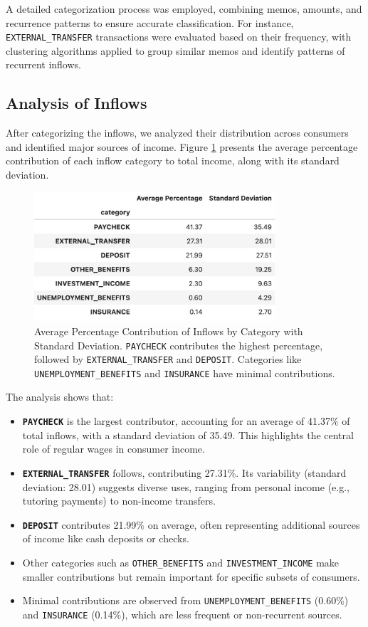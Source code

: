 \documentclass[12pt,letterpaper]{article}
\begin{document}
A detailed categorization process was employed, combining memos, amounts, and recurrence patterns to ensure accurate classification. For instance, \texttt{EXTERNAL\_TRANSFER} transactions were evaluated based on their frequency, with clustering algorithms applied to group similar memos and identify patterns of recurrent inflows.

\subsection{Analysis of Inflows}
After categorizing the inflows, we analyzed their distribution across consumers and identified major sources of income. Figure \ref{fig:inflow_contributions} presents the average percentage contribution of each inflow category to total income, along with its standard deviation.

\begin{figure}[H]
    \centering
    \includegraphics[width=0.8\textwidth]{figure/inflows.jpeg}
    \caption{Average Percentage Contribution of Inflows by Category with Standard Deviation. \texttt{PAYCHECK} contributes the highest percentage, followed by \texttt{EXTERNAL\_TRANSFER} and \texttt{DEPOSIT}. Categories like \texttt{UNEMPLOYMENT\_BENEFITS} and \texttt{INSURANCE} have minimal contributions.}
    \label{fig:inflow_contributions}
\end{figure}

The analysis shows that:
\begin{itemize}
    \item \textbf{\texttt{PAYCHECK}} is the largest contributor, accounting for an average of 41.37\% of total inflows, with a standard deviation of 35.49. This highlights the central role of regular wages in consumer income.
    \item \textbf{\texttt{EXTERNAL\_TRANSFER}} follows, contributing 27.31\%. Its variability (standard deviation: 28.01) suggests diverse uses, ranging from personal income (e.g., tutoring payments) to non-income transfers.
    \item \textbf{\texttt{DEPOSIT}} contributes 21.99\% on average, often representing additional sources of income like cash deposits or checks.
    \item Other categories such as \texttt{OTHER\_BENEFITS} and \texttt{INVESTMENT\_INCOME} make smaller contributions but remain important for specific subsets of consumers.
    \item Minimal contributions are observed from \texttt{UNEMPLOYMENT\_BENEFITS} (0.60\%) and \texttt{INSURANCE} (0.14\%), which are less frequent or non-recurrent sources.
\end{itemize}
\end{document}
